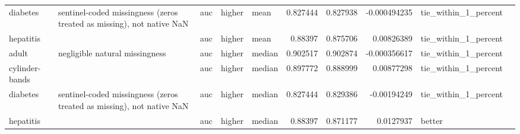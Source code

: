 \begin{table}[ht]
{\begin{tabular}{lllllrrrll}
 diabetes       & sentinel-coded missingness (zeros treated as missing), not native NaN & auc                            & higher             & mean             &                   0.827444 &               0.827938 &                    -0.000494235 & tie\_within\_1\_percent &                                                                                                                    \\
 hepatitis      &                                                                       & auc                            & higher             & mean             &                   0.88397  &               0.875706 &                     0.00826389  & tie\_within\_1\_percent &                                                                                                                    \\
 adult          & negligible natural missingness                                        & auc                            & higher             & median           &                   0.902517 &               0.902874 &                    -0.000356617 & tie\_within\_1\_percent &                                                                                                                    \\
 cylinder-bands &                                                                       & auc                            & higher             & median           &                   0.897772 &               0.888999 &                     0.00877298  & tie\_within\_1\_percent &                                                                                                                    \\
 diabetes       & sentinel-coded missingness (zeros treated as missing), not native NaN & auc                            & higher             & median           &                   0.827444 &               0.829386 &                    -0.00194249  & tie\_within\_1\_percent &                                                                                                                    \\
 hepatitis      &                                                                       & auc                            & higher             & median           &                   0.88397  &               0.871177 &                     0.0127937   & better               &                                                                                                                    \\

\end{tabular}}
\end{table}
